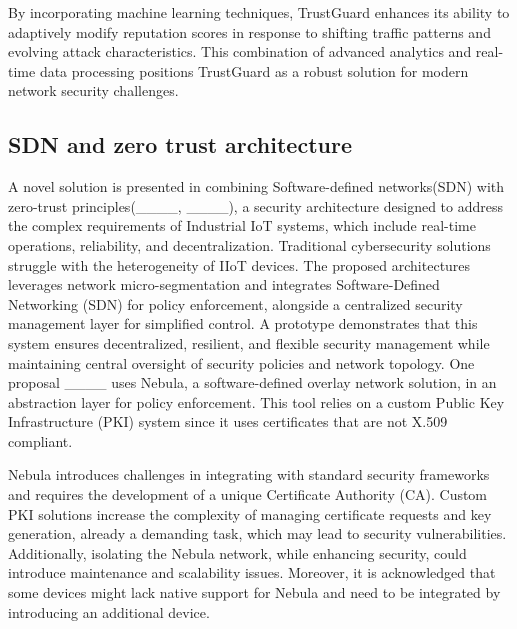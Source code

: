 By incorporating machine learning techniques, TrustGuard enhances its ability to adaptively modify reputation scores in response to shifting traffic patterns and evolving attack characteristics. This combination of advanced analytics and real-time data processing positions TrustGuard as a robust solution for modern network security challenges.

\subsection{SDN and zero trust architecture}
A novel solution is presented in combining Software-defined networks(SDN) with zero-trust principles(____, ____), a security architecture designed to address the complex requirements of Industrial IoT systems, which include real-time operations, reliability, and decentralization. Traditional cybersecurity solutions struggle with the heterogeneity of IIoT devices. The proposed architectures leverages network micro-segmentation and integrates Software-Defined Networking (SDN) for policy enforcement, alongside a centralized security management layer for simplified control. A prototype demonstrates that this system ensures decentralized, resilient, and flexible security management while maintaining central oversight of security policies and network topology. One proposal ____ uses Nebula, a software-defined overlay network solution, in an abstraction layer for policy enforcement. This tool relies on a custom Public Key Infrastructure (PKI) system since it uses certificates that are not X.509 compliant. 

Nebula introduces challenges in integrating with standard security frameworks and requires the development of a unique Certificate Authority (CA). Custom PKI solutions increase the complexity of managing certificate requests and key generation, already a demanding task, which may lead to security vulnerabilities. Additionally, isolating the Nebula network, while enhancing security, could introduce maintenance and scalability issues. Moreover, it is acknowledged that some devices might lack native support for Nebula and need to be integrated by introducing an additional device.

